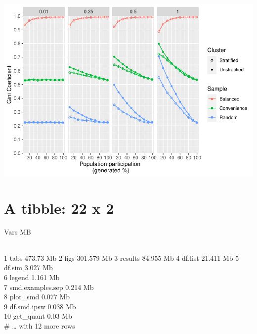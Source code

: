 \documentclass[
  english,
  man,floatsintext]{apa6}
\begin{document}
\includegraphics{5---Analysis_files/figure-latex/unnamed-chunk-34-1.pdf}

\hypertarget{a-tibble-22-x-2}{%
\section{A tibble: 22 x 2}\label{a-tibble-22-x-2}}

Vars MB\\
\strut \\
1 tabs 473.73 Mb
2 figs 301.579 Mb
3 results 84.955 Mb
4 df.list 21.411 Mb
5 df.sim 3.027 Mb\\
6 legend 1.161 Mb\\
7 smd.examples.sep 0.214 Mb\\
8 plot\_smd 0.077 Mb\\
9 df.smd.ipsw 0.038 Mb\\
10 get\_quant 0.03 Mb\\
\# \ldots{} with 12 more rows
\end{document}
